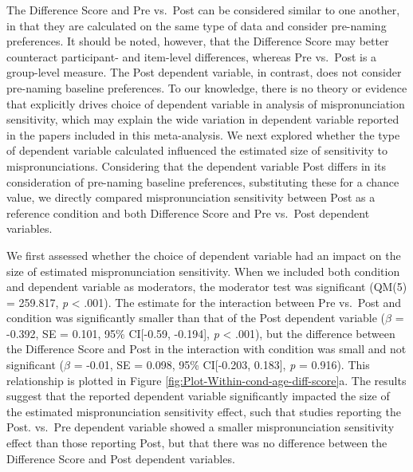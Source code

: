 \documentclass[man]{apa6}
\begin{document}
The Difference Score and Pre vs.~Post can be considered similar to one another, in that they are calculated on the same type of data and consider pre-naming preferences. It should be noted, however, that the Difference Score may better counteract participant- and item-level differences, whereas Pre vs.~Post is a group-level measure. The Post dependent variable, in contrast, does not consider pre-naming baseline preferences. To our knowledge, there is no theory or evidence that explicitly drives choice of dependent variable in analysis of mispronunciation sensitivity, which may explain the wide variation in dependent variable reported in the papers included in this meta-analysis. We next explored whether the type of dependent variable calculated influenced the estimated size of sensitivity to mispronunciations. Considering that the dependent variable Post differs in its consideration of pre-naming baseline preferences, substituting these for a chance value, we directly compared mispronunciation sensitivity between Post as a reference condition and both Difference Score and Pre vs.~Post dependent variables.

We first assessed whether the choice of dependent variable had an impact on the size of estimated mispronunciation sensitivity. When we included both condition and dependent variable as moderators, the moderator test was significant (QM(5) = 259.817, \emph{p} \textless{} .001). The estimate for the interaction between Pre vs.~Post and condition was significantly smaller than that of the Post dependent variable (\(\beta\) = -0.392, SE = 0.101, 95\% CI{[}-0.59, -0.194{]}, \emph{p} \textless{} .001), but the difference between the Difference Score and Post in the interaction with condition was small and not significant (\(\beta\) = -0.01, SE = 0.098, 95\% CI{[}-0.203, 0.183{]}, \emph{p} = 0.916). This relationship is plotted in Figure \ref{fig:Plot-Within-cond-age-diff-score}a. The results suggest that the reported dependent variable significantly impacted the size of the estimated mispronunciation sensitivity effect, such that studies reporting the Post. vs.~Pre dependent variable showed a smaller mispronunciation sensitivity effect than those reporting Post, but that there was no difference between the Difference Score and Post dependent variables.
\end{document}
